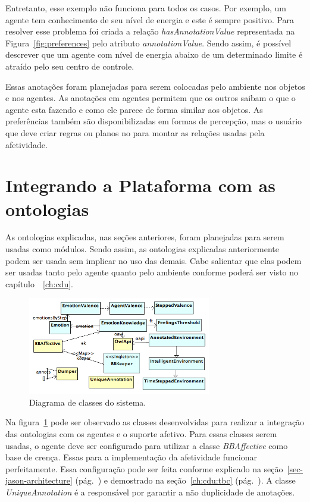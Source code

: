 Entretanto, esse exemplo não funciona para todos os casos. Por exemplo, um
agente tem conhecimento de seu nível de energia e este é sempre positivo. Para
resolver esse problema foi criada a relação \emph{hasAnnotationValue}
representada na Figura~\ref{fig:preferences} pelo atributo
\emph{annotationValue}. Sendo assim, é possível descrever que um agente com
nível de energia abaixo de um determinado limite é atraído pelo seu centro de
controle.

Essas anotações foram planejadas para serem colocadas pelo ambiente
nos objetos e nos agentes. As anotações em agentes permitem que os outros saibam
o que o agente esta fazendo e como ele parece de forma similar aos objetos. As
preferências também são disponibilizadas em formas de percepção, mas o usuário
que deve criar regras ou planos no \jason para montar as relações usadas pela
afetividade.

\section{Integrando a Plataforma \jason com as ontologias} \label{ch:p:ipjo}

As ontologias explicadas, nas seções anteriores, foram planejadas para serem
usadas como módulos. Sendo assim, as ontologias explicadas anteriormente
podem ser usada sem implicar no uso das demais. Cabe salientar que elas podem ser
usadas tanto pelo agente quanto pelo ambiente conforme poderá ser visto no
capítulo~~\ref{ch:cdu}.

\begin{figure}[b]
  \centering
  \includegraphics[width=8cm]{figuras/implementacao-15dez2011.png}
  \caption{Diagrama de classes do sistema.}
  \label{fig:dcs}
\end{figure}

Na figura~\ref{fig:dcs} pode ser observado as classes desenvolvidas para
realizar a integração das ontologias com os agentes \jason e o suporte
afetivo. Para essas classes
serem usadas, o agente deve ser configurado para utilizar a classe
\emph{BBAffective} como base de crença. Essas para a implementação da
afetividade funcionar perfeitamente. Essa configuração pode ser feita conforme explicado na
seção~\ref{sec-jason-architecture} (pág.~\pageref{sec-jason-architecture}) e
demostrado na seção~\ref{ch:cdu:tbc} (pág.~\pageref{ch:cdu:tbc}). A classe
\emph{UniqueAnnotation} é a responsável por garantir a não duplicidade de
anotações. %

